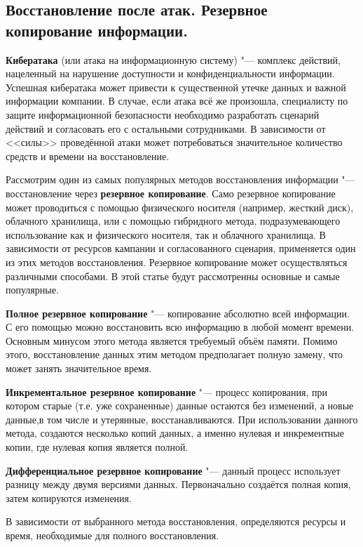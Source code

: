 \newpage
\subsection{Восстановление после атак. Резервное копирование информации.}
    \textbf{Кибератака} (или атака на информационную систему) "--- комплекс действий, нацеленный на нарушение доступности и конфиденциальности информации.
    Успешная кибератака может привести к существенной утечке данных и важной информации компании.
    В случае, если атака всё же произошла, специалисту по защите информационной безопасности необходимо разработать сценарий действий и согласовать его 
    с остальными сотрудниками. В зависимости от <<силы>> проведённой атаки может потребоваться значительное количество средств и времени на восстановление.

    Рассмотрим один из самых популярных методов восстановления информации "--- восстановление через \textbf{резервное копирование}. Само резервное копирование 
    может проводиться с помощью физического носителя (например, жесткий диск), облачного хранилища, или с помощью гибридного метода, подразумевающего использование
    как и физического носителя, так и облачного хранилища. В зависимости от ресурсов кампании и согласованного сценария, применяется один из этих методов восстановления.
    Резервное копирование может осуществляться различными способами. В этой статье будут рассмотренны основные и самые популярные\cite{main_methods}.

    \textbf{Полное резервное копирование} "--- копирование абсолютно всей информации. С его помощью можно восстановить всю информацию в любой момент времени. Основным минусом
    этого метода является требуемый объём памяти. Помимо этого, восстановление данных этим методом предполагает полную замену, что может занять значительное время.

    \textbf{Инкрементальное резервное копирование} "--- процесс копирования, при котором старые (т.е. уже сохраненные) данные остаются без изменений, а новые данные,в том числе и утерянные, 
    восстанавливаются. При использовании данного метода, создаются несколько копий данных, а именно нулевая и инкрементные копии, где нулевая копия является полной.

    \textbf{Дифференциальное резервное копирование} "--- данный процесс использует разницу между двумя версиями данных. Первоначально создаётся полная копия, затем копируются изменения.

    В зависимости от выбранного метода восстановления, определяются ресурсы и время, необходимые для полного восстановления.


